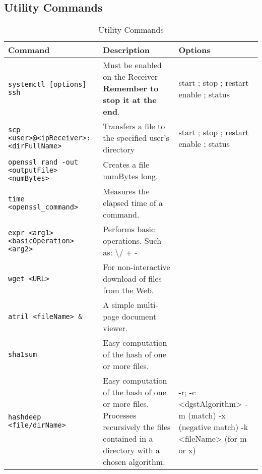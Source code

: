 \subsection{Utility Commands}
\begin{table}[H]
	\centering
    \begin{tabular}{|p{5cm}|p{6cm}|p{5cm}|}\hline
        \rowcolor{gray!30}
        \textbf{Command} & \textbf{Description} & \textbf{Options} \\ \hline

		\texttt{systemctl [options] ssh} 
		& Must be enabled on the Receiver
			\newline \textbf{Remember to stop it at the end}.
		& start ; stop ; restart
			\newline enable ; status 
		\\ \hline

		\texttt{scp <user>@<ipReceiver>\newline:<dirFullName>} 
		& Transfers a file to the specified user’s directory
		& start ; stop ; restart
			\newline enable ; status 
		\\ \hline

		\texttt{openssl rand -out <outputFile> <numBytes>} 
		& Creates a file numBytes long.
		&
		\\ \hline

		\texttt{time <openssl\_command>}
			& Measures the elapsed time of a command.
			&
			\\ \hline

		\texttt{expr <arg1> <basicOperation> <arg2>}
			& Performs basic operations.
				\newline Such as: \textbackslash* / + - 
			& 
			\\ \hline
		
		\texttt{wget <URL>}
			& For non-interactive download of files from the Web.
			& 
			\\ \hline

		\texttt{atril <fileName> \&}
			& A simple multi-page document viewer.
			& 
			\\ \hline

		\texttt{sha1sum}
			& Easy computation of the hash of one or more files.
			& 
			\\ \hline

		\texttt{hashdeep <file/dirName>}
			& Easy computation of the hash of one or more files. Processes recursively the files contained in a directory with a chosen algorithm.
			& -r; -c <dgstAlgorithm>
				\newline -m (match)
				\newline -x (negative match)
				\newline -k <fileName> (for m or x)
			\\ \hline

	\end{tabular}
	\label{tab:utilityCommands}
	\caption{Utility Commands}
\end{table}
